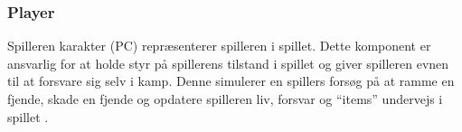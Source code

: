 \subsubsection{Player}
Spilleren karakter (PC) repræsenterer spilleren i spillet. Dette komponent er ansvarlig for at
holde styr på spillerens tilstand i spillet og giver spilleren evnen til at forsvare
sig selv i kamp. Denne simulerer en spillers forsøg på at ramme en fjende, skade en 
fjende og opdatere spilleren liv, forsvar og ``items'' undervejs i spillet 
\parencite[Section 13.3.2][]{TekniskBilag}.


\newpage
